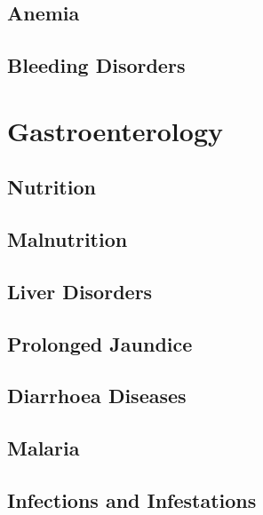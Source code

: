 \documentclass[
  letterpaper,
  DIV=11,
  numbers=noendperiod]{scrreprt}
\begin{document}
\hypertarget{anemia}{%
\chapter{Anemia}\label{anemia}}

\hypertarget{bleeding-disorders}{%
\chapter{Bleeding Disorders}\label{bleeding-disorders}}

\part{{Gastroenterology}}

\hypertarget{nutrition}{%
\chapter{Nutrition}\label{nutrition}}

\hypertarget{malnutrition}{%
\chapter{Malnutrition}\label{malnutrition}}

\hypertarget{liver-disorders}{%
\chapter{Liver Disorders}\label{liver-disorders}}

\hypertarget{prolonged-jaundice}{%
\chapter{Prolonged Jaundice}\label{prolonged-jaundice}}

\hypertarget{diarrhoea-diseases}{%
\chapter{Diarrhoea Diseases}\label{diarrhoea-diseases}}


\hypertarget{malaria}{%
\chapter{Malaria}\label{malaria}}


\hypertarget{infections-and-infestations}{%
\chapter{Infections and
Infestations}\label{infections-and-infestations}}
\end{document}
